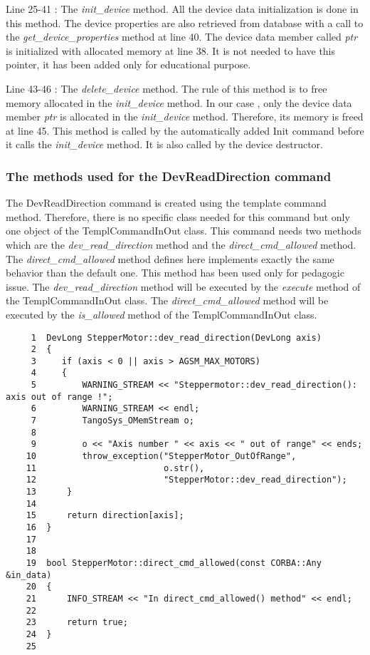 Line 25-41 : The \emph{init\_device} method. All
the device data initialization is done in this method. The device
properties are also retrieved from database with a call to the \emph{get\_device\_properties}
method at line 40. The device data member called \emph{ptr} is initialized
with allocated memory at line 38. It is not needed to have this pointer,
it has been added only for educational purpose.

Line 43-46 : The \emph{delete\_device} method.
The rule of this method is to free memory allocated in the \emph{init\_device}
method. In our case , only the device data member \emph{ptr} is allocated
in the \emph{init\_device} method. Therefore, its memory is freed
at line 45. This method is called by the automatically added Init
command before it calls the \emph{init\_device} method. It is also
called by the device destructor.


\subsubsection{The methods used for the DevReadDirection command}

The DevReadDirection command is created using the template command
method. Therefore, there is no specific class needed for this command
but only one object of the TemplCommandInOut class. This command needs
two methods which are the \emph{dev\_read\_direction} method and the
\emph{direct\_cmd\_allowed} method. The \emph{direct\_cmd\_allowed}
method defines here implements exactly the same behavior than the
default one. This method has been used only for pedagogic issue. The
\emph{dev\_read\_direction} method will be executed by the \emph{execute}
method of the TemplCommandInOut class. The
\emph{direct\_cmd\_allowed} method will be executed by the \emph{is\_allowed}
method of the TemplCommandInOut class.


\begin{verbatim}
     1  DevLong StepperMotor::dev_read_direction(DevLong axis)
     2  {
     3     if (axis < 0 || axis > AGSM_MAX_MOTORS)
     4     {
     5         WARNING_STREAM << "Steppermotor::dev_read_direction(): axis out of range !";
     6         WARNING_STREAM << endl;
     7         TangoSys_OMemStream o;
     8                  
     9         o << "Axis number " << axis << " out of range" << ends;
    10         throw_exception("StepperMotor_OutOfRange",
    11                         o.str(),
    12                         "StepperMotor::dev_read_direction");
    13      }
    14  
    15      return direction[axis];
    16  }
    17  
    18  
    19  bool StepperMotor::direct_cmd_allowed(const CORBA::Any &in_data)
    20  {
    21      INFO_STREAM << "In direct_cmd_allowed() method" << endl;
    22          
    23      return true;
    24  }
    25  
\end{verbatim}


